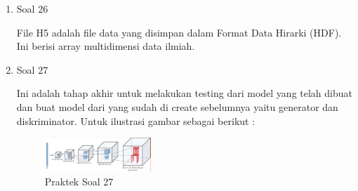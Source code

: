 \begin{enumerate}
	\item Soal 26
	\hfill\break
	
	File H5 adalah file data yang disimpan dalam Format Data Hirarki (HDF). Ini berisi array multidimensi data ilmiah.

	\item Soal 27
	\hfill\break
	
	Ini adalah tahap akhir untuk melakukan testing dari model yang telah dibuat dan buat model dari yang sudah di create sebelumnya yaitu generator dan diskriminator. Untuk ilustrasi gambar sebagai berikut : 

	\begin{figure}[H]
	\centering
		\includegraphics[width=4cm]{figures/1174012/chapter8/praktek27.PNG}
		\caption{Praktek Soal 27}
	\end{figure}
\end{enumerate}
